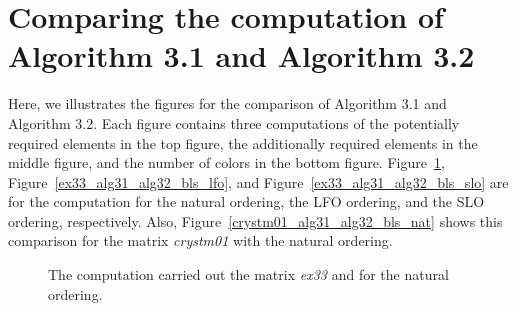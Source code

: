 \documentclass[12pt, twoside,a4paper,toc=bibliography]{scrbook}
\newcommand{\figref}[1]{Figure~\protect\ref{#1}}
\begin{document}
\section{Comparing the computation of Algorithm 3.1 and Algorithm 3.2}
\label{app.compare.alg31.alg32}
Here, we illustrates the figures for the comparison of Algorithm 3.1 and Algorithm 3.2.
Each figure contains three computations of the potentially required elements in the top figure,
the additionally required elements in the middle figure, and the number of colors in the bottom figure.
\figref{ex33_alg31_alg32_bls_nat}, \figref{ex33_alg31_alg32_bls_lfo},
and \figref{ex33_alg31_alg32_bls_slo} are for the computation for the natural ordering,
the LFO ordering, and the SLO ordering, respectively.
Also, \figref{crystm01_alg31_alg32_bls_nat} shows this comparison for the matrix \textit{crystm01}
with the natural ordering.
\begin{figure}
\caption{The computation carried  out the matrix \textit{ex33} and for the natural ordering.}
\label{ex33_alg31_alg32_bls_nat}
\end{figure}
\end{document}
